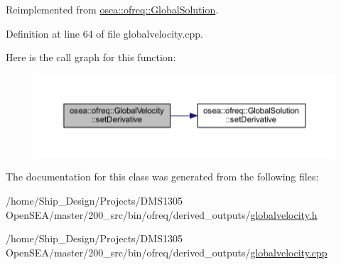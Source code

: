 Reimplemented from \hyperlink{classosea_1_1ofreq_1_1_global_solution_a537163391f1f55d073720b20f69acfa5}{osea\-::ofreq\-::\-Global\-Solution}.



Definition at line 64 of file globalvelocity.\-cpp.



Here is the call graph for this function\-:
\nopagebreak
\begin{figure}[H]
\begin{center}
\leavevmode
\includegraphics[width=350pt]{classosea_1_1ofreq_1_1_global_velocity_a11229a6dbc7f85f3c321b5eddb127f10_cgraph}
\end{center}
\end{figure}




The documentation for this class was generated from the following files\-:\begin{DoxyCompactItemize}
\item 
/home/\-Ship\-\_\-\-Design/\-Projects/\-D\-M\-S1305 Open\-S\-E\-A/master/200\-\_\-src/bin/ofreq/derived\-\_\-outputs/\hyperlink{globalvelocity_8h}{globalvelocity.\-h}\item 
/home/\-Ship\-\_\-\-Design/\-Projects/\-D\-M\-S1305 Open\-S\-E\-A/master/200\-\_\-src/bin/ofreq/derived\-\_\-outputs/\hyperlink{globalvelocity_8cpp}{globalvelocity.\-cpp}\end{DoxyCompactItemize}
